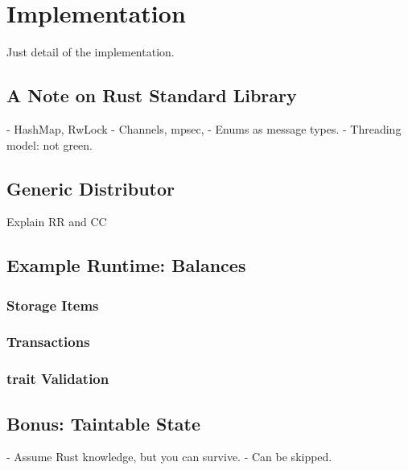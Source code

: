 \chapter{Implementation}

Just detail of the implementation.

\section{A Note on Rust Standard Library}

- HashMap, RwLock
- Channels, mpsec,
    - Enums as message types.
- Threading model: not green.

\section{Generic Distributor}
Explain RR and CC

\section{Example Runtime: Balances}

\subsection{Storage Items}
\subsection{Transactions}
\subsection{trait Validation}

\section{Bonus: Taintable State}
- Assume Rust knowledge, but you can survive.
- Can be skipped.